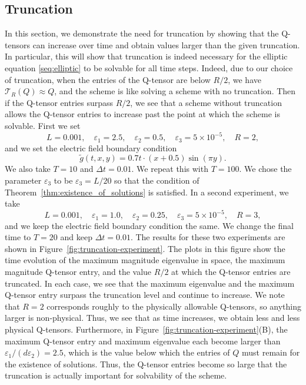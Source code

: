 \documentclass[10pt,letterpaper]{amsart}
\newcommand{\T}{\mathcal T}
\theoremstyle{definition}{\newtheorem{definition}[lemma]{Definition}}
\theoremstyle{note}{\newtheorem{claim}{Claim}[section]
\newtheorem*{claim*}{Claim}}
\numberwithin{equation}{section}
\begin{document}
\subsection{Truncation}\label{sec:truncation-experiment}
In this section, we demonstrate the need for truncation by showing that the Q-tensors can increase over time and obtain values larger than the given truncation. In particular, this will show that truncation is indeed necessary for the elliptic equation \eqref{seq:elliptic} to be solvable for all time steps. Indeed, due to our choice of truncation, when the entries of the Q-tensor are below $R/2$, we have $\T_R(Q)\approx Q$, and the scheme is like solving a scheme with no truncation. Then if the Q-tensor entries surpass $R/2$, we see that a scheme without truncation allows the Q-tensor entries to increase past the point at which the scheme is solvable. First we set 
\[
    L = 0.001,\quad \varepsilon_1 = 2.5,\quad \varepsilon_2 = 0.5,\quad \varepsilon_3 = 5\times10^{-5},\quad R = 2,
\]
and we set the electric field boundary condition
\[
    \tilde g(t, x, y) = 0.7 t \cdot (x+0.5)\sin(\pi y).
\]
We also take $T=10$ and $\Delta t = 0.01$. We repeat this with $T=100$. We chose the parameter $\varepsilon_3$ to be $\varepsilon_3 = L/20$ so that the condition of Theorem~\ref{thm:existence_of_solutions} is satisfied. In a second experiment, we take
\[
    L = 0.001,\quad \varepsilon_1 = 1.0,\quad \varepsilon_2 = 0.25,\quad \varepsilon_3 = 5\times10^{-5},\quad R = 3,
\]
and we keep the electric field boundary condition the same. We change the final time to $T=20$ and keep $\Delta t = 0.01$. The results for these two experiments are shown in Figure~\ref{fig:truncation-experiment}. The plots in this figure show the time evolution of the maximum magnitude eigenvalue in space, the maximum magnitude Q-tensor entry, and the value $R/2$ at which the Q-tensor entries are truncated. In each case, we see that the maximum eigenvalue and the maximum Q-tensor entry surpass the truncation level and continue to increase. We note that $R=2$ corresponds roughly to the physically allowable Q-tensors, so anything larger is non-physical. Thus, we see that as time increases, we obtain less and less physical Q-tensors. Furthermore, in Figure~\ref{fig:truncation-experiment}(B), the maximum Q-tensor entry and maximum eigenvalue each become larger than $\varepsilon_1 / (d\varepsilon_2) = 2.5$, which is the value below which the entries of $Q$ must remain for the existence of solutions. Thus, the Q-tensor entries become so large that the truncation is actually important for solvability of the scheme.
\end{document}
